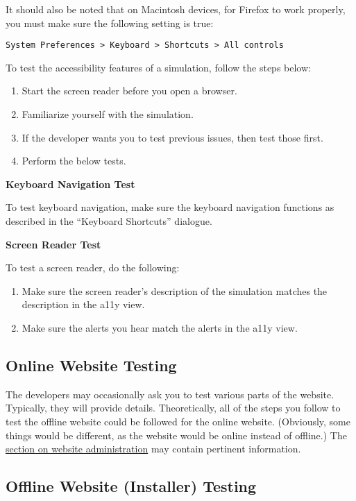 \documentclass[titlepage]{article}
\begin{document}
It should also be noted that on Macintosh devices, for Firefox to work properly, you must make sure the following setting is true:

\verb|System Preferences > Keyboard > Shortcuts > All controls|

To test the accessibility features of a simulation, follow the steps below:

		\begin{enumerate}
			\item Start the screen reader before you open a browser.
			\item Familiarize yourself with the simulation.
			\item If the developer wants you to test previous issues, then test those first.
			\item Perform the below tests.
		\end{enumerate}

\textbf{Keyboard Navigation Test}

To test keyboard navigation, make sure the keyboard navigation functions as described in the ``Keyboard Shortcuts'' dialogue.

\textbf{Screen Reader Test}

To test a screen reader, do the following:
		\begin{enumerate}
			\item Make sure the screen reader's description of the simulation matches the description in the a11y view. 
			\item Make sure the alerts you hear match the alerts in the a11y view.
		\end{enumerate}

	\subsection{Online Website Testing}

The developers may occasionally ask you to test various parts of the website. Typically, they will provide details. Theoretically, all of the steps you follow to test the offline website could be followed for the online website. (Obviously, some things would be different, as the website would be online instead of offline.) The \hyperref[subsec:wa]{section on website administration} may contain pertinent information.

	\subsection{Offline Website (Installer) Testing}
\end{document}
